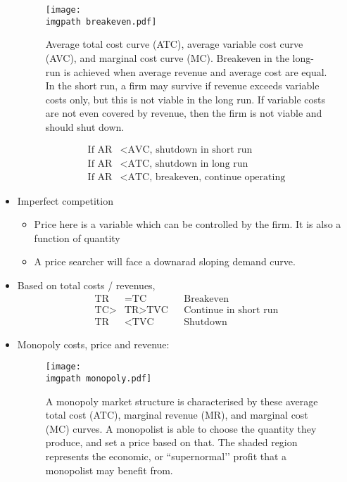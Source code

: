 \documentclass[../notes_compiled.tex]{subfiles}
\begin{document}
\begin{itemize}
\begin{figure}[h]
  \centering
  \texttt{[image: \\imgpath breakeven.pdf]}
  \caption{Average total cost curve (ATC), average variable cost curve (AVC), and marginal cost curve (MC). Breakeven in the long-run is achieved when average revenue and average cost are equal. In the short run, a firm may survive if revenue exceeds variable costs only, but this is not viable in the long run. If variable costs are not even covered by revenue, then the firm is not viable and should shut down.}
\end{figure}

\begin{align*}
\text{If }\text{AR} &< \text{AVC, shutdown in short run} \\
\text{If }\text{AR} &< \text{ATC, shutdown in long run} \\
\text{If }\text{AR} &< \text{ATC, breakeven, continue operating}
\end{align*}

\item Imperfect competition
\begin{itemize}
\item Price here is a variable which can be controlled by the firm. It is also a function of quantity
\item A price searcher will face a downarad sloping demand curve.
\end{itemize}

\item Based on total costs / revenues,
\begin{align*}
\text{TR} &= \text{TC} & &\text{Breakeven} \\
\text{TC}>&\text{TR}>\text{TVC} & &\text{Continue in short run} \\
\text{TR}&<\text{TVC} & &\text{Shutdown}
\end{align*}

\item Monopoly costs, price and revenue:
\begin{figure}[h]
  \centering
  \texttt{[image: \\imgpath monopoly.pdf]}
  \caption{A monopoly market structure is characterised by these average total cost (ATC), marginal revenue (MR), and marginal cost (MC) curves. A monopolist is able to choose the quantity they produce, and set a price based on that. The shaded region represents the economic, or ``supernormal’’ profit that a monopolist may benefit from.}
  \label{fig-monopoly}
\end{figure}


\end{itemize}
\end{document}
